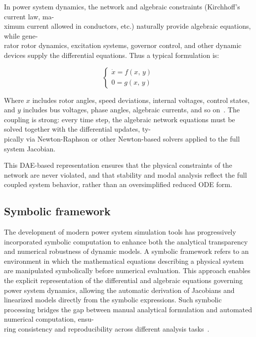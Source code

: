  
In power system dynamics, the network and algebraic constraints (Kirchhoff's current law, ma-\\ximum current allowed in conductors, etc.) naturally provide algebraic equations, 
while gene-\\rator rotor dynamics, excitation systems, governor control, and other dynamic devices supply the differential equations. Thus a typical formulation is:

\begin{equation}
\begin{cases}
\dot{x} = f(x,\, y) \\
0 = g(x,\, y)
\end{cases}
\end{equation}

Where $x$ includes rotor angles, speed deviations, internal voltages, control states, and $y$ includes bus voltages, phase angles, algebraic currents, and so on~\cite{SauerPaiBook}. 
The coupling is strong: every time step, the algebraic network equations must be solved together with the differential updates, ty-\\pically via Newton-Raphson or other Newton-based 
solvers applied to the full system Jacobian.   

This DAE-based representation ensures that the physical constraints of the network are never violated, and that stability and modal analysis reflect the full coupled system behavior,
rather than an oversimplified reduced ODE form.  

\subsection{Symbolic framework}

The development of modern power system simulation tools has progressively incorporated symbolic computation to enhance both the analytical transparency and numerical
robustness of dynamic models. A symbolic framework refers to an environment in which the mathematical equations describing a physical system are manipulated symbolically
before numerical evaluation. This approach enables the explicit representation of the differential and algebraic equations governing power system dynamics, allowing the 
automatic derivation of Jacobians and linearized models directly from the symbolic expressions.
Such symbolic processing bridges the gap between manual analytical formulation and automated numerical computation, ensu-\\ring consistency and reproducibility across 
different analysis tasks~\cite{SymbolicHantao}.

